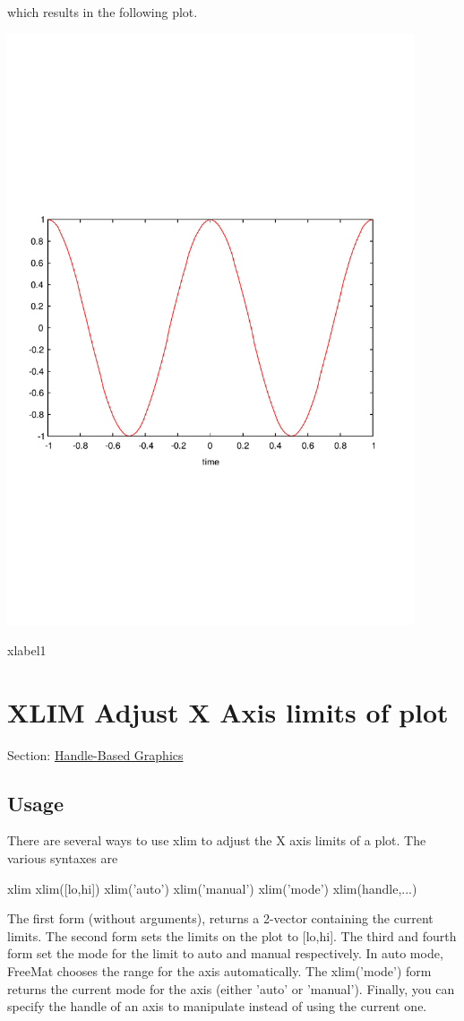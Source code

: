 which results in the following plot.  
\begin{DoxyImage}
\includegraphics[width=12cm]{xlabel1}
\caption{xlabel1}
\end{DoxyImage}
 \hypertarget{handle_xlim}{}\section{X\-L\-I\-M Adjust X Axis limits of plot}\label{handle_xlim}
Section\-: \hyperlink{sec_handle}{Handle-\/\-Based Graphics} \hypertarget{vtkwidgets_vtkxyplotwidget_Usage}{}\subsection{Usage}\label{vtkwidgets_vtkxyplotwidget_Usage}
There are several ways to use {\ttfamily xlim} to adjust the X axis limits of a plot. The various syntaxes are \begin{DoxyVerb}   xlim
   xlim([lo,hi])   
   xlim('auto')
   xlim('manual')
   xlim('mode')
   xlim(handle,...)
\end{DoxyVerb}
 The first form (without arguments), returns a 2-\/vector containing the current limits. The second form sets the limits on the plot to {\ttfamily \mbox{[}lo,hi\mbox{]}}. The third and fourth form set the mode for the limit to {\ttfamily auto} and {\ttfamily manual} respectively. In {\ttfamily auto} mode, Free\-Mat chooses the range for the axis automatically. The {\ttfamily xlim('mode')} form returns the current mode for the axis (either {\ttfamily 'auto'} or {\ttfamily 'manual'}). Finally, you can specify the handle of an axis to manipulate instead of using the current one.

